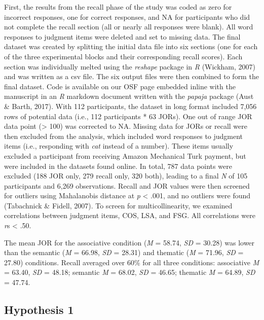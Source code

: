\documentclass[english,man]{apa6}
\theoremstyle{definition}
\theoremstyle{definition}
\theoremstyle{definition}
\theoremstyle{remark}
\begin{document}
First, the results from the recall phase of the study was coded as zero
for incorrect responses, one for correct responses, and NA for
participants who did not complete the recall section (all or nearly all
responses were blank). All word responses to judgment items were deleted
and set to missing data. The final dataset was created by splitting the
initial data file into six sections (one for each of the three
experimental blocks and their corresponding recall scores). Each section
was individually melted using the \emph{reshape} package in \emph{R}
(Wickham, 2007) and was written as a csv file. The six output files were
then combined to form the final dataset. Code is available on our OSF
page embedded inline with the manuscript in an \emph{R} markdown
document written with the \emph{papaja} package (Aust \& Barth, 2017).
With 112 participants, the dataset in long format included 7,056 rows of
potential data (i.e., 112 participants * 63 JORs). One out of range JOR
data point (\textgreater{} 100) was corrected to NA. Missing data for
JORs or recall were then excluded from the analysis, which included word
responses to judgment items (i.e., responding with \emph{cat} instead of
a number). These items usually excluded a participant from receiving
Amazon Mechanical Turk payment, but were included in the datasets found
online. In total, 787 data points were excluded (188 JOR only, 279
recall only, 320 both), leading to a final \emph{N} of 105 participants
and 6,269 observations. Recall and JOR values were then screened for
outliers using Mahalanobis distance at \emph{p} \textless{} .001, and no
outliers were found (Tabachnick \& Fidell, 2007). To screen for
multicollinearity, we examined correlations between judgment items, COS,
LSA, and FSG. All correlations were \emph{r}s \textless{} .50.

The mean JOR for the associative condition (\emph{M} = 58.74, \emph{SD}
= 30.28) was lower than the semantic (\emph{M} = 66.98, \emph{SD} =
28.31) and thematic (\emph{M} = 71.96, \emph{SD} = 27.80) conditions.
Recall averaged over 60\% for all three conditions: associative \emph{M}
= 63.40, \emph{SD} = 48.18; semantic \emph{M} = 68.02, \emph{SD} =
46.65; thematic \emph{M} = 64.89, \emph{SD} = 47.74.

\subsection{Hypothesis 1}\label{hypothesis-1}
\end{document}
